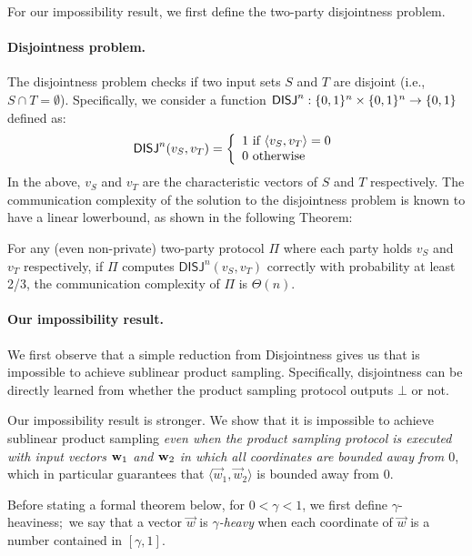 For our impossibility result, we first define the two-party disjointness problem.

\paragraph{Disjointness problem.}
The disjointness problem checks if two input sets $S$ and $T$ are
disjoint (i.e., $S \cap T = \emptyset$). Specifically, we consider 
a function $\mathsf{DISJ}^n: \{0,1\}^n \times \{0,1\}^n \rightarrow \{0,1\}$ defined as:
$$ \mathsf{DISJ}^n(v_S, v_T) = \left \{ 
    \begin{array}{l} 1 \mbox{ if } \langle v_S,  v_T \rangle = 0 \\
    0 \mbox{ otherwise } 
  \end{array} \right .$$ 
In the above, $v_S$ and $v_T$ are the characteristic vectors of $S$ and
$T$ respectively. The communication complexity of the solution to the
disjointness problem is known to have a linear lowerbound, as shown in
the following Theorem:

\begin{theorem}
For any (even non-private) two-party protocol $\Pi$ where each party
holds $v_S$ and $v_T$ respectively, if $\Pi$ computes $\mathsf{DISJ}^n(v_S,
v_T)$ correctly with probability at least 2/3, the communication
complexity of $\Pi$ is $\Theta(n)$.
\end{theorem}

\paragraph{Our impossibility result.}
We first observe that a simple reduction from Disjointness gives us
that is impossible to achieve sublinear product sampling. Specifically,
disjointness can be directly learned from whether the product sampling
protocol outputs $\bot$ or not. 

Our impossibility result is stronger. We show that it is impossible to
achieve sublinear product sampling \emph{even when the product sampling
protocol is executed with input vectors $\mathbf{w}_1$ and $\mathbf{w}_2$ in which all coordinates are bounded away from $0$}, which in particular guarantees that $\langle \vec{w}_1, \vec{w}_2 \rangle$ is bounded away from $0$. 

%
Before stating a formal theorem below, for $0 < \gamma < 1$, we first
define $\gamma$-heaviness;~we say that a vector $\vec{w}$ is
\emph{$\gamma$-heavy} when each coordinate of $\vec{w}$ is a number
contained in $[\gamma,1]$. 

